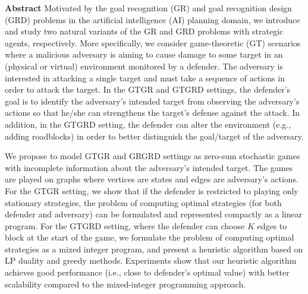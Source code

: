 %
%

\begin{center}

\bigskip

\begin{Large}
\textbf{\theTitle}
\end{Large}

\bigskip

\begin{large}
\theAuthor
\end{large}

\bigskip
\bigskip

\textbf{Abstract}
Motivated by the goal recognition (GR) 
and goal recognition design (GRD) problems 
in the artificial intelligence (AI) planning domain, 
we introduce and study two natural variants of the 
GR and GRD problems with strategic agents, respectively.  
More specifically, we consider game-theoretic (GT)
scenarios where a malicious adversary 
is aiming to cause damage to some target in an
(physical or virtual) environment monitored by a defender.
The adversary is interested in attacking 
a single target and must take a sequence of actions in order to attack the target. 
In the GTGR and GTGRD settings, the defender's goal is to identify the adversary's 
intended target from observing the adversary's actions 
so that he/she can strengthens the target's defense against the attack. 
In addition, in the GTGRD setting, the defender can alter the environment (e.g., adding roadblocks) 
in order to better distinguish the goal/target of the adversary. 



We propose to model GTGR and GRGRD settings as zero-sum stochastic games
with incomplete information about the adversary's intended target. %
The games are played on graphs where vertices are states and edges are adversary's actions.
For the GTGR setting,
we show that if the defender is restricted to playing only stationary strategies, 
the problem of computing optimal strategies (for both defender and adversary)
can be formulated and represented compactly as a linear program.
For the GTGRD setting,
where the defender can choose $K$ edges to block at the start of the game, 
we formulate the problem of computing optimal strategies as a mixed integer program,
and present a heuristic algorithm
based on LP duality and greedy methods.
Experiments show that our heuristic algorithm
achieves good performance (i.e., close to defender's optimal value) with better scalability
compared to the mixed-integer programming approach.


\end{center}
